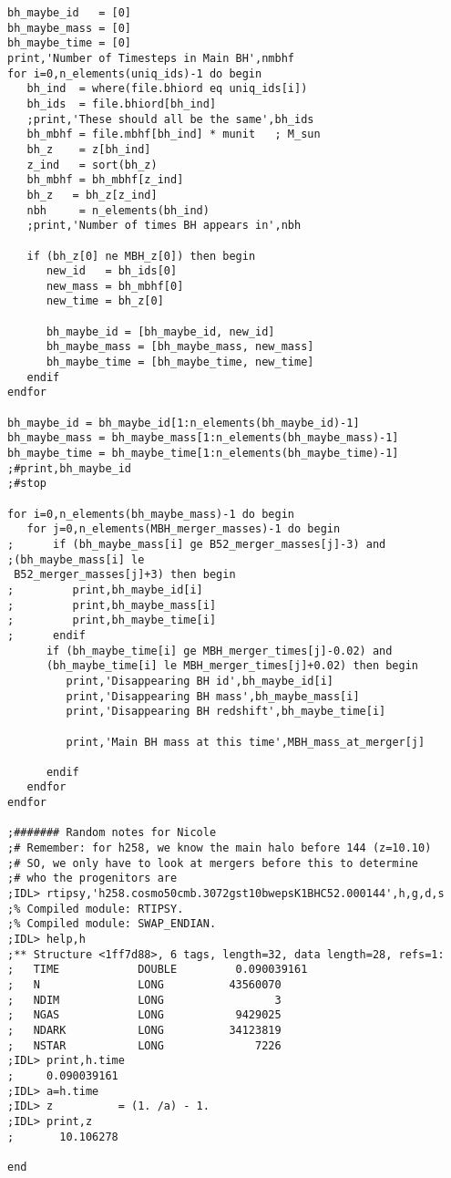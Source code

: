 \documentclass[12pt,headA,chapB]{fiskthesis}
\begin{document}
\begin{verbatim}
bh_maybe_id   = [0]
bh_maybe_mass = [0]
bh_maybe_time = [0]
print,'Number of Timesteps in Main BH',nmbhf
for i=0,n_elements(uniq_ids)-1 do begin
   bh_ind  = where(file.bhiord eq uniq_ids[i])
   bh_ids  = file.bhiord[bh_ind]
   ;print,'These should all be the same',bh_ids
   bh_mbhf = file.mbhf[bh_ind] * munit   ; M_sun
   bh_z    = z[bh_ind]
   z_ind   = sort(bh_z)
   bh_mbhf = bh_mbhf[z_ind]
   bh_z   = bh_z[z_ind]
   nbh     = n_elements(bh_ind)
   ;print,'Number of times BH appears in',nbh

   if (bh_z[0] ne MBH_z[0]) then begin
      new_id   = bh_ids[0]
      new_mass = bh_mbhf[0]
      new_time = bh_z[0]
      
      bh_maybe_id = [bh_maybe_id, new_id]
      bh_maybe_mass = [bh_maybe_mass, new_mass]
      bh_maybe_time = [bh_maybe_time, new_time]
   endif
endfor

bh_maybe_id = bh_maybe_id[1:n_elements(bh_maybe_id)-1]
bh_maybe_mass = bh_maybe_mass[1:n_elements(bh_maybe_mass)-1]
bh_maybe_time = bh_maybe_time[1:n_elements(bh_maybe_time)-1]
;#print,bh_maybe_id
;#stop

for i=0,n_elements(bh_maybe_mass)-1 do begin
   for j=0,n_elements(MBH_merger_masses)-1 do begin
;      if (bh_maybe_mass[i] ge B52_merger_masses[j]-3) and 
;(bh_maybe_mass[i] le
 B52_merger_masses[j]+3) then begin
;         print,bh_maybe_id[i]
;         print,bh_maybe_mass[i]
;         print,bh_maybe_time[i]
;      endif
      if (bh_maybe_time[i] ge MBH_merger_times[j]-0.02) and 
      (bh_maybe_time[i] le MBH_merger_times[j]+0.02) then begin
         print,'Disappearing BH id',bh_maybe_id[i]
         print,'Disappearing BH mass',bh_maybe_mass[i]
         print,'Disappearing BH redshift',bh_maybe_time[i]

         print,'Main BH mass at this time',MBH_mass_at_merger[j]

      endif
   endfor
endfor

;####### Random notes for Nicole 
;# Remember: for h258, we know the main halo before 144 (z=10.10)
;# SO, we only have to look at mergers before this to determine
;# who the progenitors are
;IDL> rtipsy,'h258.cosmo50cmb.3072gst10bwepsK1BHC52.000144',h,g,d,s
;% Compiled module: RTIPSY.
;% Compiled module: SWAP_ENDIAN.
;IDL> help,h
;** Structure <1ff7d88>, 6 tags, length=32, data length=28, refs=1:
;   TIME            DOUBLE         0.090039161
;   N               LONG          43560070
;   NDIM            LONG                 3
;   NGAS            LONG           9429025
;   NDARK           LONG          34123819
;   NSTAR           LONG              7226
;IDL> print,h.time
;     0.090039161
;IDL> a=h.time
;IDL> z          = (1. /a) - 1.
;IDL> print,z
;       10.106278

end
\end{verbatim}
\end{document}
